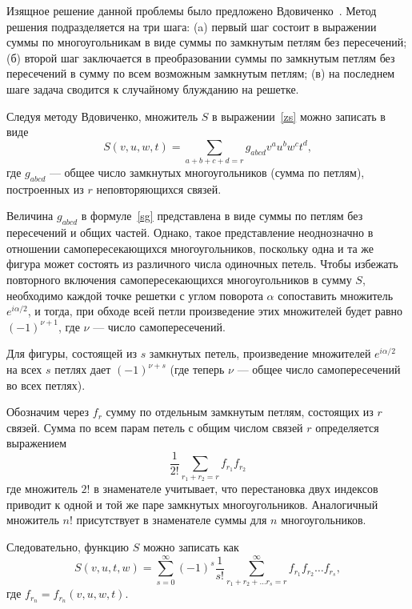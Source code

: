 \documentclass[utf8,12pt]{jetp}
\begin{document}
Изящное решение данной проблемы было предложено Вдовиченко~\cite{vdovichenko1964}. Метод решения подразделяется на три шага: (a) первый шаг состоит в выражении суммы по многоугольникам в виде суммы по замкнутым петлям без пересечений; (б) второй шаг заключается в преобразовании суммы по замкнутым петлям без пересечений в сумму по всем возможным замкнутым петлям; (в) на последнем шаге задача сводится к случайному блужданию на решетке.

Следуя методу Вдовиченко, множитель $S$ в выражении~\eqref{zs} можно записать в виде
\begin{equation}
	S(v, u, w, t) = \sum_{a+b+c+d = r} g_{abcd} v^a u^b w^c t^d,
	\label{sg} 
\end{equation}
где $g_{abcd}$ --- общее число замкнутых многоугольников (сумма по петлям), построенных из $r$ неповторяющихся связей.

Величина $g_{abcd}$ в формуле~\eqref{sg} представлена в виде суммы по петлям без пересечений и общих частей. Однако, такое представление неоднозначно в отношении самопересекающихся многоугольников, поскольку одна и та же фигура может состоять из различного числа одиночных петель. Чтобы избежать повторного включения самопересекающихся многоугольников в сумму $S$, необходимо каждой точке решетки с углом поворота $\alpha$ сопоставить множитель $e^{i\alpha/2}$, и тогда, при обходе всей петли произведение этих множителей будет равно $(−1)^{\nu+1}$, где $\nu$ — число самопересечений.

Для фигуры, состоящей из $s$ замкнутых петель, произведение множителей $e^{i\alpha/2}$ на всех $s$ петлях дает $(−1)^{\nu+s}$ (где теперь $\nu$ --- общее число самопересечений во всех петлях).

Обозначим через $f_r$ сумму по отдельным замкнутым петлям, состоящих из $r$ связей. Сумма по всем парам петель с общим числом связей $r$ определяется выражением
\begin{equation*}
	\frac{1}{2!} \sum_{r_1 + r_2 = r} f_{r_1} f_{r_2}
\end{equation*}
где множитель $2!$ в знаменателе учитывает, что перестановка двух индексов приводит к одной и той же паре замкнутых многоугольников. Аналогичный множитель $n!$ присутствует в знаменателе суммы для $n$ многоугольников.

Следовательно, функцию $S$ можно записать как
\begin{equation}
	S (v, u, t, w) = \sum_{s = 0}^{\infty} (-1)^s \frac{1}{s!} \sum_{r_1 + r_2 + \dots r_s = r}^{\infty} f_{r_1} f_{r_2} \dots f_{r_s}, 
\end{equation}
где $f_{r_n} = f_{r_n}(v, u, w, t)$.
\end{document}
